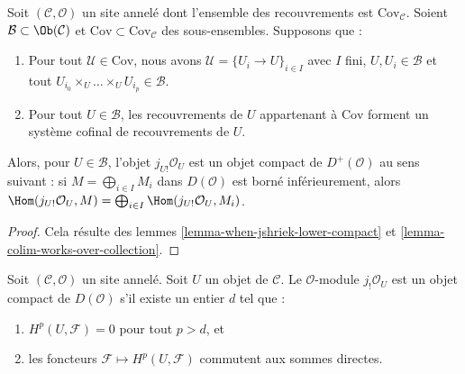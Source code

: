 \begin{lemma}
\label{lemma-when-jshriek-lower-compact-worked-out}
Soit $(\mathcal{C}, \mathcal{O})$ un site annelé dont l'ensemble des
recouvrements est $\text{Cov}_\mathcal{C}$. Soient
$\mathcal{B} \subset \Ob(\mathcal{C})$ et
$\text{Cov} \subset \text{Cov}_\mathcal{C}$
des sous-ensembles. Supposons que :
\begin{enumerate}
\item Pour tout $\mathcal{U} \in \text{Cov}$, nous avons
$\mathcal{U} = \{U_i \to U\}_{i \in I}$ avec $I$ fini,
$U, U_i \in \mathcal{B}$ et tout
$U_{i_0} \times_U \ldots \times_U U_{i_p} \in \mathcal{B}$.
\item Pour tout $U \in \mathcal{B}$, les recouvrements de $U$ appartenant à
$\text{Cov}$ forment un système cofinal de recouvrements de $U$.
\end{enumerate}
Alors, pour $U \in \mathcal{B}$, l'objet $j_{U!}\mathcal{O}_U$ est un objet
compact de $D^+(\mathcal{O})$ au sens suivant : si
$M = \bigoplus_{i \in I} M_i$ dans $D(\mathcal{O})$ est borné inférieurement,
alors $\Hom(j_{U!}\mathcal{O}_U, M) =
\bigoplus_{i \in I} \Hom(j_{U!}\mathcal{O}_U, M_i)$.
\end{lemma}

\begin{proof}
Cela résulte des lemmes \ref{lemma-when-jshriek-lower-compact} et
\ref{lemma-colim-works-over-collection}.
\end{proof}

\begin{lemma}
\label{lemma-when-jshriek-compact}
Soit $(\mathcal{C}, \mathcal{O})$ un site annelé. Soit $U$ un objet de
$\mathcal{C}$. Le $\mathcal{O}$-module $j_!\mathcal{O}_U$ est un objet
compact de $D(\mathcal{O})$ s'il existe un entier $d$ tel que :
\begin{enumerate}
\item $H^p(U, \mathcal{F}) = 0$ pour tout $p > d$, et
\item les foncteurs $\mathcal{F} \mapsto H^p(U, \mathcal{F})$ commutent aux
sommes directes.
\end{enumerate}
\end{lemma}

